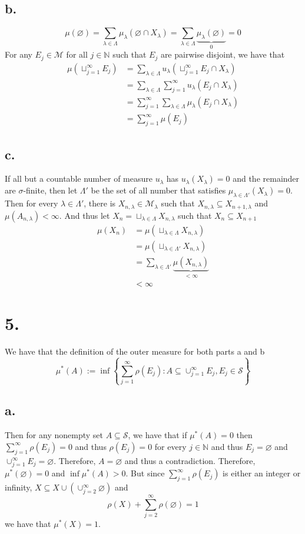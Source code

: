 \documentclass[11pt]{article}
\theoremstyle{mystyle}
\theoremstyle{definition}
\begin{document}
\subsection*{b.}
\[ 
  \mu(\varnothing) = \sum_{\lambda \in \Lambda} \mu_\lambda(\varnothing \cap X_\lambda) = \sum_{\lambda \in \Lambda} \underbrace{\mu_\lambda(\varnothing)}_{0} = 0 
\]
For any $E_j \in \mathcal{M}$ for all $j \in \mathbb{N}$ such that $E_j$ are pairwise disjoint, we have that 
\begin{align*}
  \mu(\sqcup_{j=1}^\infty E_j) 
  &= \sum_{\lambda \in \Lambda} u_\lambda (\sqcup_{j=1}^\infty E_j \cap X_\lambda) \\
  &= \sum_{\lambda \in \Lambda} \sum_{j=1}^\infty u_\lambda(E_j \cap X_\lambda) \\ 
  &= \sum_{j=1}^\infty \sum_{\lambda \in \Lambda} \mu_\lambda (E_j \cap X_\lambda) \\
  &= \sum_{j=1}^\infty \mu(E_j)
\end{align*}
\subsection*{c.}
If all but a countable number of measure $u_\lambda$ has $u_\lambda(X_\lambda) = 0$ and the remainder are $\sigma$-finite, then let $\Lambda'$ be the set of all number that satisfies $\mu_{\lambda \in \Lambda'} (X_\lambda) = 0$. Then for every $\lambda \in \Lambda'$, there is $X_{n, \lambda} \in \mathcal{M}_\lambda$ such that $X_{n, \lambda} \subseteq X_{n+1, \lambda}$ and $\mu(A_{n, \lambda}) < \infty$. And thus let $X_n = \sqcup_{\lambda \in \Lambda} X_{n, \lambda}$ such that $X_n \subseteq X_{n+1}$
\begin{align*}
  \mu(X_n) 
  &= \mu(\sqcup_{\lambda \in \Lambda} X_{n, \lambda}) \\
  &= \mu(\sqcup_{\lambda \in \Lambda'} X_{n, \lambda}) \\
  &= \sum_{\lambda \in \Lambda'} \underbrace{\mu(X_{n, \lambda})}_{<\infty} \\
  &< \infty 
\end{align*}
\newpage
\section*{5.}
We have that the definition of the outer measure for both parts a and b
\[
  \mu^*(A) := \inf \left\{\sum_{j=1}^\infty \rho(E_j): A \subseteq \cup_{j=1}^\infty E_j, E_j \in \mathcal{S} \right\}
\]
\subsection*{a.}
Then for any nonempty set $A \subseteq \mathcal{S}$, we have that if $\mu^*(A) = 0$ then $\sum_{j=1}^\infty \rho(E_j) = 0$ and thus $\rho(E_j) = 0$ for every $j \in \mathbb{N}$ and thus $E_j = \varnothing$ and $\cup_{j=1}^\infty E_j = \varnothing$. Therefore, $A = \varnothing$ and thus a contradiction. Therefore, $\mu^*(\varnothing) = 0$ and $\inf \mu^*(A) > 0$. But since $\sum_{j=1}^\infty \rho(E_j)$ is either an integer or infinity, $X \subseteq X \cup (\cup_{j=2}^\infty \varnothing)$ and 
\[
  \rho(X) + \sum_{j=2}^\infty \rho(\varnothing) = 1
\]
we have that $\mu^*(X) = 1$. 
\end{document}
